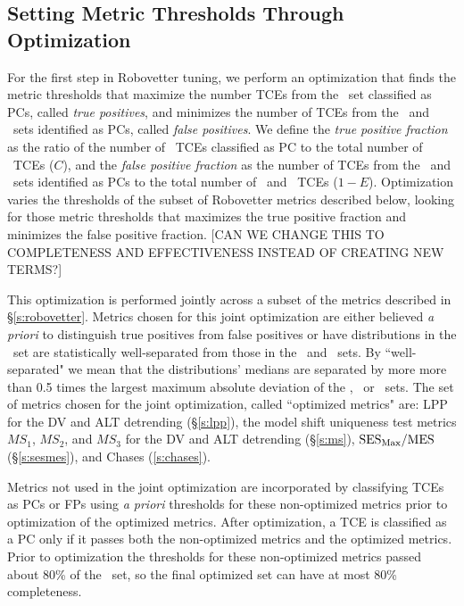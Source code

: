 \subsection{Setting Metric Thresholds Through Optimization}
\label{s:full_optimize}
For the first step in Robovetter tuning, we perform an optimization that finds the metric thresholds that maximize the number TCEs from the \injtce\ set classified as PCs, called {\it true positives}, and minimizes the number of TCEs from the \scrtce\ and \invtce\ sets identified as PCs, called {\it false positives}.  We define the {\it true positive fraction} as the ratio of the number of \injtce\ TCEs classified as PC to the total number of \injtce\ TCEs ($C$), and the {\it false positive fraction} as the number of TCEs from the \scrtce\ and \invtce\ sets identified as PCs to the total number of \scrtce\ and \invtce\ TCEs ($1-E$).  Optimization varies the thresholds of the subset of Robovetter metrics described below, looking for those metric thresholds that maximizes the true positive fraction and minimizes the false positive fraction.  [CAN WE CHANGE THIS TO COMPLETENESS AND EFFECTIVENESS INSTEAD OF CREATING NEW TERMS?]

This optimization is performed jointly across a subset of the metrics described in \S\ref{s:robovetter}.  Metrics chosen for this joint optimization are either believed {\it a priori} to distinguish true positives from false positives or have distributions in the \injtce\ set are statistically well-separated from those in the \scrtce\ and \invtce\ sets.  By ``well-separated" we mean that the distributions' medians are separated by more more than 0.5 times the largest maximum absolute deviation of the \injtce, \scrtce\ or \invtce\ sets.  The set of metrics chosen for the joint optimization, called ``optimized metrics" are: LPP for the DV and ALT detrending (\S\ref{s:lpp}), the model shift uniqueness test metrics $MS_{1}$, $MS_{2}$, and $MS_{3}$ for the DV and ALT detrending (\S\ref{s:ms}), ${{\rm SES}_{\rm Max} / {\rm MES}}$ (\S\ref{s:sesmes}), and Chases (\s\ref{s:chases}). 

Metrics not used in the joint optimization are incorporated by classifying TCEs as PCs or FPs using {\it a priori} thresholds for these non-optimized metrics prior to optimization of the optimized metrics.  After optimization, a TCE is classified as a PC only if it passes both the non-optimized metrics and the optimized metrics.  Prior to optimization the thresholds for these non-optimized metrics passed about 80\% of the  \injtce\ set, so the final optimized set can have at most 80\% completeness.  


